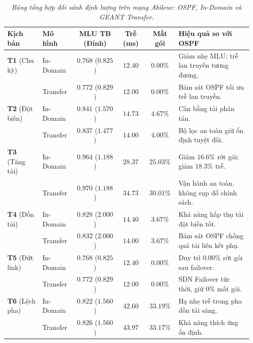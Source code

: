 \documentclass[11pt,a4paper]{article}
\begin{document}
\begin{table}[htbp]
\centering
\caption{\textit{Bảng tổng hợp đối sánh định lượng trên mạng Abilene: OSPF, In-Domain và GEANT Transfer.}}
\label{tab:abilene_summary}
\footnotesize
\setlength{\tabcolsep}{3pt}
\renewcommand{\arraystretch}{1.15}
\begin{tabularx}{\textwidth}{@{} l l c c c >{\raggedright\arraybackslash}X @{}}
\toprule
\textbf{Kịch bản} & \textbf{Mô hình} & \textbf{MLU TB (Đỉnh)} & \textbf{Trễ (ms)} & \textbf{Mất gói} & \textbf{Hiệu quả so với OSPF} \\
\midrule
\textbf{T1} (Chu kỳ) & In-Domain & $\mathbf{0.768}$ ($\mathbf{0.825}$) & $12.40$ & $0.00\%$ & Giảm nhẹ MLU; trễ lan truyền tương đương. \\
& Transfer & $0.772$ ($0.829$) & $\mathbf{12.00}$ & $0.00\%$ & Bám sát OSPF tối ưu trễ lan truyền. \\
\midrule
\textbf{T2} (Đột biến) & In-Domain & $0.841$ ($1.570$) & $14.73$ & $4.67\%$ & Cân bằng tải phân tán. \\
& Transfer & $\mathbf{0.837}$ ($\mathbf{1.477}$) & $\mathbf{14.00}$ & $\mathbf{4.00\%}$ & Bộ lọc an toàn giữ ổn định tuyệt đối. \\
\midrule
\textbf{T3} (Tăng tải) & In-Domain & $\mathbf{0.964}$ ($\mathbf{1.188}$) & $\mathbf{28.37}$ & $\mathbf{25.03\%}$ & Giảm $16.6\%$ rớt gói; giảm $18.3\%$ trễ. \\
& Transfer & $0.970$ ($1.188$) & $34.73$ & $30.01\%$ & Vận hành an toàn, không sụp đổ chính sách. \\
\midrule
\textbf{T4} (Dồn tải) & In-Domain & $\mathbf{0.828}$ ($2.000$) & $14.40$ & $3.67\%$ & Khả năng hấp thụ tải đột biến tốt. \\
& Transfer & $0.832$ ($2.000$) & $\mathbf{14.00}$ & $\mathbf{3.67\%}$ & Bám sát OSPF chống quá tải liên kết phụ. \\
\midrule
\textbf{T5} (Đứt link) & In-Domain & $\mathbf{0.768}$ ($\mathbf{0.825}$) & $12.40$ & $0.00\%$ & Duy trì $0.00\%$ rớt gói sau failover. \\
& Transfer & $0.772$ ($0.829$) & $\mathbf{12.00}$ & $0.00\%$ & SDN Failover tức thời, giữ $0\%$ mất gói. \\
\midrule
\textbf{T6} (Lệch pha) & In-Domain & $\mathbf{0.822}$ ($1.560$) & $\mathbf{42.60}$ & $33.19\%$ & Hạ nhẹ trễ trong pha dồn tải sáng. \\
& Transfer & $0.826$ ($1.560$) & $43.97$ & $\mathbf{33.17\%}$ & Khả năng thích ứng ổn định. \\
\bottomrule
\end{tabularx}
\end{table}
\end{document}
